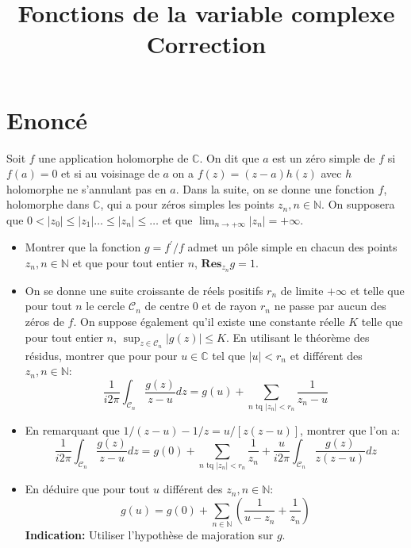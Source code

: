 \documentclass[a4paper,12pt]{amsart}
\title{Fonctions de la variable complexe \\ Correction }
\newcommand{\C}{\ensuremath{\mathbb{C}}}
\begin{document}
\maketitle

\section*{Enoncé}
Soit $f$ une application holomorphe de $\C$. On dit que $a$ est un zéro simple de $f$ si $f(a)=0$ et si au voisinage de $a$ on a $f(z) = (z-a) h(z)$ avec $h$ holomorphe ne s'annulant pas en $a$. 
Dans la suite, on se donne une fonction $f$, holomorphe dans $\C$, qui a pour zéros simples les points $z_n, n \in \mathbb{N}$. On supposera que $0< |z_0|\leq |z_1| \dots \leq |z_n| \leq \dots$ et que $\lim_{n \to +\infty} |z_n| = +\infty$.
\begin{itemize}
\item Montrer que la fonction $g = f^\prime/f$ admet un pôle simple en chacun des points $z_n, n \in \mathbb{N}$ et que pour tout entier $n$, $\textbf{Res}_{z_n}g=1$. 
\item On se donne une suite croissante de réels positifs $r_n$ de limite $+\infty$ et telle que pour tout $n$ le cercle $\mathcal{C}_n$ de centre 0 et de rayon $r_n$ ne passe par aucun des zéros de $f$. On suppose également qu'il existe une constante réelle $K$ telle que pour tout entier $n$, $\sup_{z \in \mathcal{C}_n} |g(z)| \leq K$.
En utilisant le théorème des résidus,
montrer que pour pour $u \in \C$ tel que $|u| < r_n$ et différent des $z_n, n \in \mathbb{N}$:
\[
\frac{1}{i 2 \pi} \int_{\mathcal{C}_n}\frac{g(z)}{z-u} dz = g(u) + \sum_{n \text{ tq } |z_n| < r_n} \frac{1}{z_n - u}
\]
\item En remarquant que $1/(z-u) - 1/z = u/[z(z-u)]$, montrer que l'on a:
\[
\frac{1}{i 2 \pi} \int_{\mathcal{C}_n}\frac{g(z)}{z-u} dz = g(0) + \sum_{n \text{ tq } |z_n| < r_n}\frac{1}{z_n} + \frac{u}{i 2 \pi}\int_{\mathcal{C}_n} \frac{g(z)}{z(z-u)} dz
\]
\item En déduire que pour tout $u$ différent des $z_n, n \in \mathbb{N}$:
\[
g(u) = g(0) + \sum_{n \in \mathbb{N}} \left(\frac{1}{u-z_n} + \frac{1}{z_n}\right)
\]
\textbf{Indication:} Utiliser l'hypothèse de majoration sur $g$.

\end{itemize}
\end{document}
